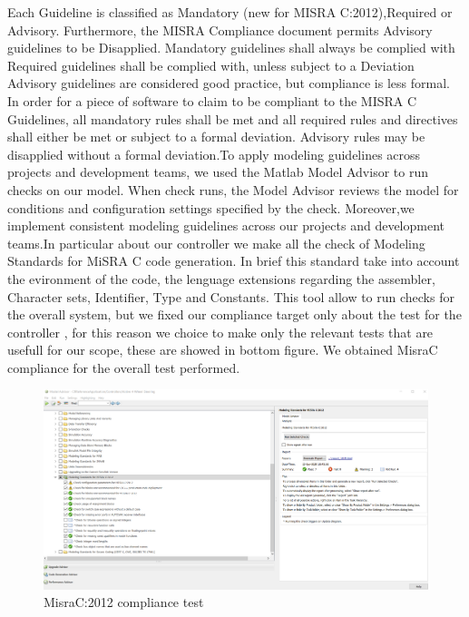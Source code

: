Each Guideline is classified as  Mandatory (new for MISRA C:2012),Required or Advisory. Furthermore, the MISRA Compliance document permits Advisory guidelines to be Disapplied. Mandatory guidelines shall always be complied with Required guidelines shall be complied with, unless subject to a Deviation Advisory guidelines are considered good practice, but compliance is less formal.
In order for a piece of software to claim to be compliant to the MISRA C Guidelines, all mandatory rules shall be met and all required rules and directives shall either be met or subject to a formal deviation. Advisory rules may be disapplied without a formal deviation.To apply modeling guidelines across projects and development teams, we used the Matlab Model Advisor to run checks on our model. When check runs, the Model Advisor reviews the model for conditions and configuration settings specified by the check. Moreover,we implement consistent modeling guidelines across our projects and development teams.In particular about our controller we make all the check of Modeling Standards for MiSRA C code generation. In brief this standard take into account the evironment of the code, the lenguage extensions regarding the assembler, Character sets, Identifier, Type and Constants. 
This tool allow to run checks for the overall system, but we fixed our compliance target only about the test for the controller , for this reason we choice to make only the relevant tests that are usefull for our scope, these are showed in bottom figure. We obtained MisraC compliance for the overall test performed.  
\\
\begin{figure}[hpt]
	\centering
	\includegraphics[width=1\textwidth]{../Images/VCS/Misra.png}
	\caption{MisraC:2012 compliance test}
	\label{gitattributes}
\end{figure}   